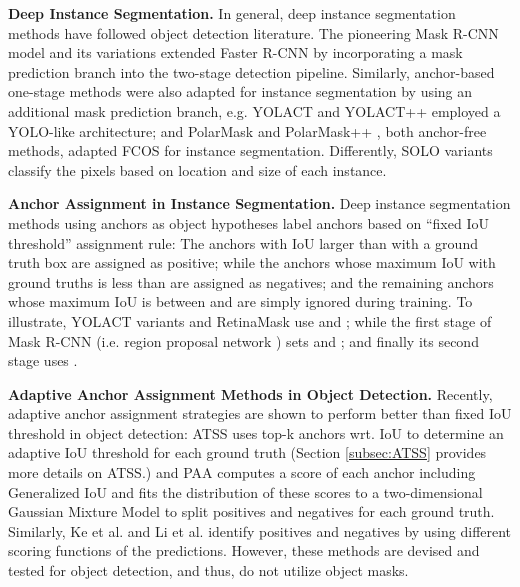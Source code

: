 \documentclass{bmvc2k}
\begin{document}
\noindent \textbf{Deep Instance Segmentation.} In general, deep instance segmentation methods have followed object detection literature. The pioneering Mask R-CNN model \cite{MaskRCNN} and its variations \cite{maskscoring,RSLoss} extended Faster R-CNN \cite{FasterRCNN} by incorporating a mask prediction branch into the two-stage detection pipeline. Similarly,  anchor-based one-stage methods were also adapted for instance segmentation by using an additional mask prediction branch, e.g. YOLACT \cite{yolact} and YOLACT++ \cite{yolact-plus} employed a YOLO-like architecture; and PolarMask \cite{polarmask} and PolarMask++ \cite{PolarMask-plus}, both anchor-free methods, adapted FCOS \cite{FCOS} for instance segmentation. Differently, SOLO variants \cite{solo,solov2} classify the pixels based on  location and size of each instance.

\noindent \textbf{Anchor Assignment in Instance Segmentation.} Deep instance segmentation methods using anchors as object hypotheses label anchors based on ``fixed IoU threshold'' assignment rule: The anchors with IoU larger than  with a ground truth box are assigned as positive; while the anchors whose maximum IoU with ground truths is less than  are assigned as negatives; and the remaining anchors whose maximum IoU is between  and  are simply ignored during training. To illustrate, YOLACT variants \cite{yolact,yolact-plus} and RetinaMask \cite{retinamask} use   and ; while the first stage of Mask R-CNN (i.e. region proposal network \cite{FasterRCNN}) sets  and ; and finally its second stage \cite{MaskRCNN} uses . 



\noindent \textbf{Adaptive Anchor Assignment Methods in Object Detection.} Recently, adaptive anchor assignment strategies are shown to perform better than fixed IoU threshold in object detection: ATSS \cite{ATSS} uses top-k anchors wrt. IoU to determine an adaptive IoU threshold for each ground truth (Section \ref{subsec:ATSS} provides more details on ATSS.) and PAA \cite{paa} computes a score of each anchor including Generalized IoU and fits the distribution of these scores to a two-dimensional Gaussian Mixture Model to split positives and negatives for each ground truth. Similarly, Ke et al. \cite{mal} and Li et al. \cite{noisyanchor} identify  positives and negatives by using different scoring functions of the predictions. However, these methods are devised and tested for object detection, and thus, do not utilize object masks. 
\end{document}
